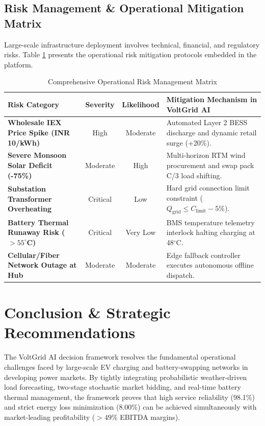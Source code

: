 \documentclass[10.5pt,a4paper]{article}
\begin{document}
\subsection{Risk Management \& Operational Mitigation Matrix}
Large-scale infrastructure deployment involves technical, financial, and regulatory risks. Table \ref{tab:risk_matrix} presents the operational risk mitigation protocols embedded in the platform.

\begin{table}[htbp]
\centering
\small
\color{brandslate}
\caption{Comprehensive Operational Risk Management Matrix}
\label{tab:risk_matrix}
\vspace{0.15cm}
\begin{tabularx}{\textwidth}{>{\raggedright\arraybackslash}p{3.6cm} c c >{\raggedright\arraybackslash}X}
\toprule
\textbf{\color{brandnavy}Risk Category} & \textbf{\color{brandnavy}Severity} & \textbf{\color{brandnavy}Likelihood} & \textbf{\color{brandnavy}Mitigation Mechanism in VoltGrid AI} \\
\midrule
\textbf{Wholesale IEX Price Spike (INR 10/kWh)} & High & Moderate & Automated Layer 2 BESS discharge and dynamic retail surge (+20\%). \\
\textbf{Severe Monsoon Solar Deficit (-75\%)} & Moderate & High & Multi-horizon RTM wind procurement and swap pack C/3 load shifting. \\
\textbf{Substation Transformer Overheating} & Critical & Low & Hard grid connection limit constraint ($Q_{\text{grid}} \le C_{\text{limit}} - 5\%$). \\
\textbf{Battery Thermal Runaway Risk ($>55^\circ$C)} & Critical & Very Low & BMS temperature telemetry interlock halting charging at 48$^\circ$C. \\
\textbf{Cellular/Fiber Network Outage at Hub} & Moderate & Moderate & Edge fallback controller executes autonomous offline dispatch. \\
\bottomrule
\end{tabularx}
\end{table}

\section{Conclusion \& Strategic Recommendations}

The VoltGrid AI decision framework resolves the fundamental operational challenges faced by large-scale EV charging and battery-swapping networks in developing power markets. By tightly integrating probabilistic weather-driven load forecasting, two-stage stochastic market bidding, and real-time battery thermal management, the framework proves that high service reliability (98.1\%) and strict energy loss minimization (8.00\%) can be achieved simultaneously with market-leading profitability ($>49\%$ EBITDA margins).
\end{document}
